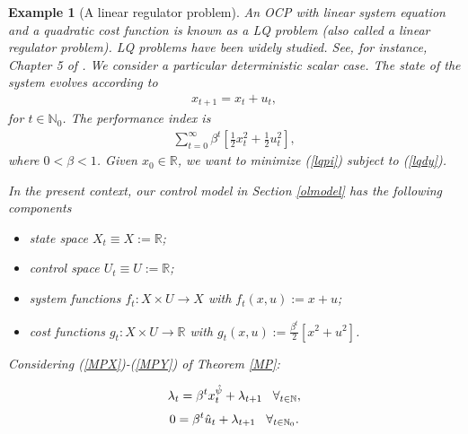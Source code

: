 \documentclass[3p]{elsarticle}
\newcommand{\rz}{\mathbb R}
\newcommand{\nat}{\mathbb N_0}
\newcommand{\natu}{\mathbb N}
\newtheorem{examp}[thm]{Example}
\begin{document}
	
	\begin{examp}[A linear regulator problem]\label{LQ}
		An OCP with linear system equation and a quadratic cost function is known as a \textit{LQ problem} (also called a  \textit{linear regulator problem}). LQ problems have been widely studied. See, for instance, Chapter 5 of \cite{Ljungq}.
		We consider a particular deterministic scalar case. The state of the system evolves according to 
		\begin{align}\label{lqdy}
		x_{t+1}=x_t+u_t,
		\end{align}
		for $t\in\nat$. The performance index is
		\begin{align}\label{lqpi}
		\sum_{t=0}^\infty\beta^t\left[ \frac{1}{2}x_t^2+\frac{1}{2}u_t^2\right],
		\end{align}
		where $0<\beta<1$.
		Given $x_0\in\mathbb R$, we want to minimize (\ref{lqpi}) subject to (\ref{lqdy}).
		
		
		In the present context, our control model in Section \ref{olmodel} has the following components
		
		\begin{itemize}
			\item state space $X_t\equiv X:=\mathbb R$;
			\item control space $U_t\equiv U:=\mathbb R$;
			\item system functions $f_t:X\times U\to X$ with $f_t(x,u):=x+u$;
			\item cost functions $g_t:X\times U\to \rz$ with $g_t(x,u):=\frac{\beta^t}{2}\left[x^2+u^2 \right] $.
		\end{itemize}
		
		
		
		
		
		Considering (\ref{MPX})-(\ref{MPY}) of Theorem \ref{MP}:
		
		
		\begin{align}\label{eq1icp}
		\lambda_t=\beta^tx_t^{\hat{\psi}}+\lambda_{t+1} \hspace{0.3cm} \forall_{t\in\natu},
		\end{align}
		\begin{align}
		0=\beta^t \hat u_t+\lambda_{t+1} \hspace{0.3cm} \forall_{t\in\nat}.
		\end{align} 
		

\end{examp}
\end{document}
